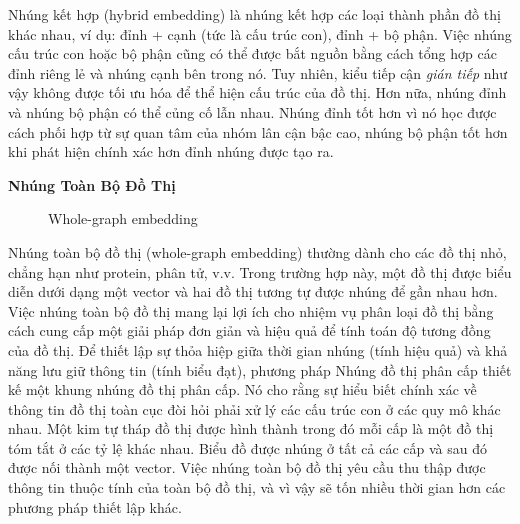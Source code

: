 Nhúng kết hợp (hybrid embedding) là nhúng kết hợp các loại thành phần đồ thị khác nhau, ví dụ: đỉnh + cạnh (tức là cấu trúc con), đỉnh + bộ phận. Việc nhúng cấu trúc con hoặc bộ phận cũng có thể được bắt nguồn bằng cách tổng hợp các đỉnh riêng lẻ và nhúng cạnh bên trong nó. Tuy nhiên, kiểu tiếp cận \textit{gián tiếp} như vậy không được tối ưu hóa để thể hiện cấu trúc của đồ thị. Hơn nữa, nhúng đỉnh và nhúng bộ phận có thể củng cố lẫn nhau. Nhúng đỉnh tốt hơn vì nó học được cách phối hợp từ sự quan tâm của nhóm lân cận bậc cao, nhúng bộ phận tốt hơn khi phát hiện chính xác hơn đỉnh nhúng được tạo ra.

\textbf{Nhúng Toàn Bộ Đồ Thị}

\begin{figure}[H]
	\centering
	
	\caption{Whole-graph embedding}
	\label{fig:wholeGraphEmbedding}
\end{figure}

Nhúng toàn bộ đồ thị (whole-graph embedding) thường dành cho các đồ thị nhỏ, chẳng hạn như protein, phân tử, v.v. Trong trường hợp này, một đồ thị được biểu diễn dưới dạng một vector và hai đồ thị tương tự được nhúng để gần nhau hơn. Việc nhúng toàn bộ đồ thị mang lại lợi ích cho nhiệm vụ phân loại đồ thị bằng cách cung cấp một giải pháp đơn giản và hiệu quả để tính toán độ tương đồng của đồ thị. Để thiết lập sự thỏa hiệp giữa thời gian nhúng (tính hiệu quả) và khả năng lưu giữ thông tin (tính biểu đạt), phương pháp Nhúng đồ thị phân cấp \cite{mousavi2017hierarchical} thiết kế một khung nhúng đồ thị phân cấp. Nó cho rằng sự hiểu biết chính xác về thông tin đồ thị toàn cục đòi hỏi phải xử lý các cấu trúc con ở các quy mô khác nhau. Một kim tự tháp đồ thị được hình thành trong đó mỗi cấp là một đồ thị tóm tắt ở các tỷ lệ khác nhau. Biểu đồ được nhúng ở tất cả các cấp và sau đó được nối thành một vector. Việc nhúng toàn bộ đồ thị yêu cầu thu thập được thông tin thuộc tính của toàn bộ đồ thị, và vì vậy sẽ tốn nhiều thời gian hơn các phương pháp thiết lập khác.

